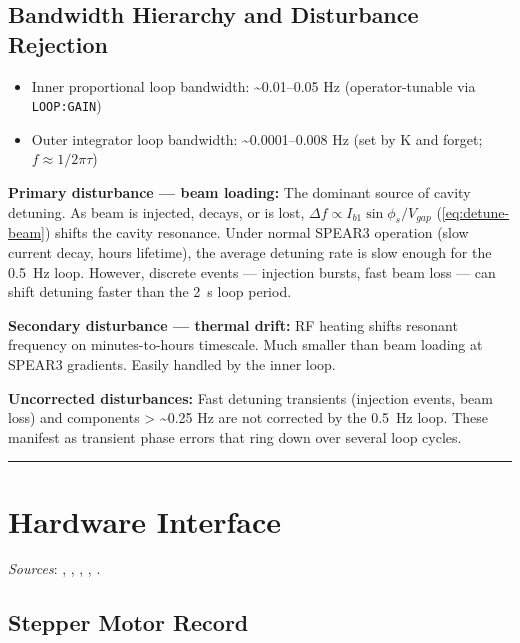 \subsection{Bandwidth Hierarchy and Disturbance Rejection}\label{sec:bandwidth}


\begin{itemize}
\tightlist
\item
  Inner proportional loop bandwidth: \textasciitilde0.01--0.05 Hz (operator-tunable via \texttt{LOOP:GAIN})
\item
  Outer integrator loop bandwidth: \textasciitilde0.0001--0.008 Hz (set by K and forget; \(f \approx 1/2\pi\tau\))
\end{itemize}

\textbf{Primary disturbance --- beam loading:} The dominant source of cavity detuning. As beam is injected, decays, or is lost, \(\Delta f \propto I_{b1} \sin\phi_s / V_{gap}\) (\cref{eq:detune-beam}) shifts the cavity resonance. Under normal SPEAR3 operation (slow current decay, hours lifetime), the average detuning rate is slow enough for the \qty{0.5}{\hertz} loop. However, discrete events --- injection bursts, fast beam loss --- can shift detuning faster than the \qty{2}{\second} loop period.

\textbf{Secondary disturbance --- thermal drift:} RF heating shifts resonant frequency on minutes-to-hours timescale. Much smaller than beam loading at SPEAR3 gradients. Easily handled by the inner loop.

\textbf{Uncorrected disturbances:} Fast detuning transients (injection events, beam loss) and components \textgreater{} \textasciitilde0.25 Hz are not corrected by the \qty{0.5}{\hertz} loop. These manifest as transient phase errors that ring down over several loop cycles.

\begin{center}\rule{0.5\linewidth}{0.5pt}\end{center}

\section{Hardware Interface}\label{sec:hardware}

\emph{Sources}: , , , , .


\subsection{Stepper Motor Record}\label{sec:motor-record}


